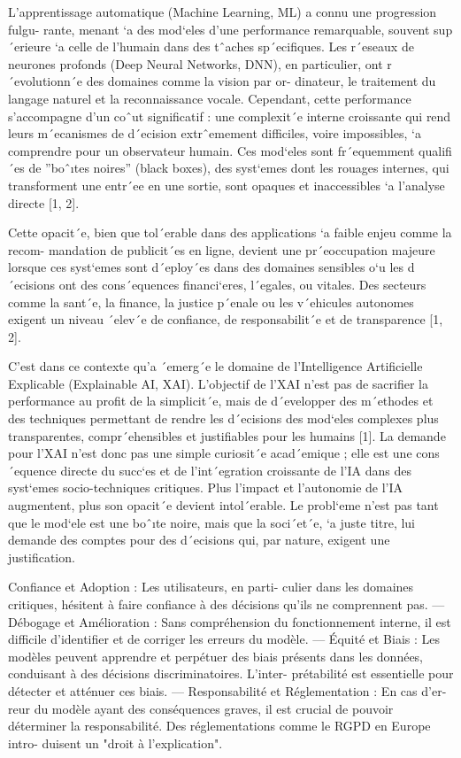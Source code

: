 L’apprentissage automatique (Machine Learning, ML) a connu une progression fulgu-
rante, menant `a des mod`eles d’une performance remarquable, souvent sup´erieure `a celle
de l’humain dans des tˆaches sp´ecifiques. Les r´eseaux de neurones profonds (Deep Neural
Networks, DNN), en particulier, ont r´evolutionn´e des domaines comme la vision par or-
dinateur, le traitement du langage naturel et la reconnaissance vocale. Cependant, cette
performance s’accompagne d’un coˆut significatif : une complexit´e interne croissante qui
rend leurs m´ecanismes de d´ecision extrˆemement difficiles, voire impossibles, `a comprendre
pour un observateur humain. Ces mod`eles sont fr´equemment qualifi´es de ”boˆıtes noires”
(black boxes), des syst`emes dont les rouages internes, qui transforment une entr´ee en une
sortie, sont opaques et inaccessibles `a l’analyse directe [1, 2].


Cette opacit´e, bien que tol´erable dans des applications `a faible enjeu comme la recom-
mandation de publicit´es en ligne, devient une pr´eoccupation majeure lorsque ces syst`emes
sont d´eploy´es dans des domaines sensibles o`u les d´ecisions ont des cons´equences financi`eres,
l´egales, ou vitales. Des secteurs comme la sant´e, la finance, la justice p´enale ou les v´ehicules
autonomes exigent un niveau ´elev´e de confiance, de responsabilit´e et de transparence [1, 2].

C’est dans ce contexte qu’a ´emerg´e le domaine de l’Intelligence Artificielle Explicable
(Explainable AI, XAI). L’objectif de l’XAI n’est pas de sacrifier la performance au profit de
la simplicit´e, mais de d´evelopper des m´ethodes et des techniques permettant de rendre les
d´ecisions des mod`eles complexes plus transparentes, compr´ehensibles et justifiables pour
les humains [1]. La demande pour l’XAI n’est donc pas une simple curiosit´e acad´emique ;
elle est une cons´equence directe du succ`es et de l’int´egration croissante de l’IA dans des
syst`emes socio-techniques critiques. Plus l’impact et l’autonomie de l’IA augmentent, plus
son opacit´e devient intol´erable. Le probl`eme n’est pas tant que le mod`ele est une boˆıte
noire, mais que la soci´et´e, `a juste titre, lui demande des comptes pour des d´ecisions qui,
par nature, exigent une justification.


Confiance et Adoption : Les utilisateurs, en parti-
culier dans les domaines critiques, hésitent à faire
confiance à des décisions qu’ils ne comprennent pas.
— Débogage et Amélioration : Sans compréhension
du fonctionnement interne, il est difficile d’identifier
et de corriger les erreurs du modèle.
— Équité et Biais : Les modèles peuvent apprendre
et perpétuer des biais présents dans les données,
conduisant à des décisions discriminatoires. L’inter-
prétabilité est essentielle pour détecter et atténuer ces
biais.
— Responsabilité et Réglementation : En cas d’er-
reur du modèle ayant des conséquences graves, il est
crucial de pouvoir déterminer la responsabilité. Des
réglementations comme le RGPD en Europe intro-
duisent un "droit à l’explication".

